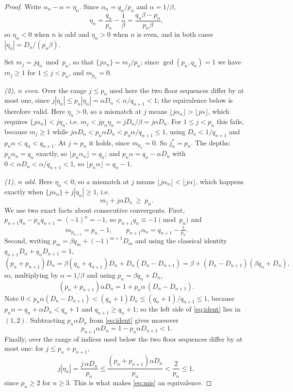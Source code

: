 \documentclass[11pt,reqno]{amsart}
\theoremstyle{plain}
\theoremstyle{definition}
\begin{document}
\begin{proof}
Write $\alpha_n-\alpha=\eta_n$. Since $\alpha_n=q_n/p_n$ and $\alpha=1/\beta$,
\[
\eta_n=\frac{q_n}{p_n}-\frac1\beta=\frac{q_n\beta-p_n}{p_n\beta},
\]
so $\eta_n<0$ when $n$ is odd and $\eta_n>0$ when $n$ is even, and in both cases
$|\eta_n|=D_n/(p_n\beta)$.

Set $m_j=jq_n \bmod p_n$, so that $\{j\alpha_n\}=m_j/p_n$; since
$\gcd(p_n,q_n)=1$ we have $m_j\ge1$ for $1\le j<p_n$, and $m_{p_n}=0$.

\emph{(2), $n$ even.} Over the range $j\le p_n$ used here the two floor
sequences differ by at most one, since
$j|\eta_n|\le p_n|\eta_n|=\alpha D_n<\alpha/q_{n+1}<1$; the equivalence below is
therefore valid. Here $\eta_n>0$, so a mismatch at $j$ means
$\lfloor j\alpha_n\rfloor>\lfloor j\alpha\rfloor$, which requires
$\{j\alpha_n\}<j\eta_n$, i.e. $m_j<jp_n\eta_n=jD_n/\beta=j\alpha D_n$. For
$1\le j<p_n$ this fails, because $m_j\ge1$ while
$j\alpha D_n<p_n\alpha D_n<p_n\alpha/q_{n+1}\le 1$, using $D_n<1/q_{n+1}$ and
$p_n\alpha<q_n<q_{n+1}$. At $j=p_n$ it holds, since $m_{p_n}=0$. So
$j^{*}_n=p_n$. The depths: $p_n\alpha_n=q_n$ exactly, so
$\lfloor p_n\alpha_n\rfloor=q_n$; and $p_n\alpha=q_n-\alpha D_n$ with
$0<\alpha D_n<\alpha/q_{n+1}<1$, so $\lfloor p_n\alpha\rfloor=q_n-1$.

\emph{(1), $n$ odd.} Here $\eta_n<0$, so a mismatch at $j$ means
$\lfloor j\alpha_n\rfloor<\lfloor j\alpha\rfloor$, which happens exactly when
$\{j\alpha_n\}+j|\eta_n|\ge1$, i.e.
\begin{equation}\label{eq:mis}
m_j+j\alpha D_n\ \ge\ p_n .
\end{equation}
We use two exact facts about consecutive convergents. First,
$p_{n+1}q_n-p_nq_{n+1}=(-1)^{n}=-1$, so $p_{n+1}q_n\equiv-1\pmod{p_n}$ and
\begin{equation}\label{eq:mstar}
m_{p_{n+1}}=p_n-1,\qquad p_{n+1}\alpha_n=q_{n+1}-\tfrac1{p_n}.
\end{equation}
Second, writing $p_m=\beta q_m+(-1)^{m+1}D_m$ and using the classical identity
$q_{n+1}D_n+q_nD_{n+1}=1$,
\[
(p_n+p_{n+1})D_n=\beta(q_n+q_{n+1})D_n+D_n(D_n-D_{n+1})
=\beta+(D_n-D_{n+1})(\beta q_n+D_n),
\]
so, multiplying by $\alpha=1/\beta$ and using $p_n=\beta q_n+D_n$,
\begin{equation}\label{eq:ident}
(p_n+p_{n+1})\alpha D_n=1+p_n\alpha\,(D_n-D_{n+1}).
\end{equation}
Note $0<p_n\alpha(D_n-D_{n+1})<(q_n+1)D_n\le (q_n+1)/q_{n+1}\le1$, because
$p_n\alpha=q_n+\alpha D_n<q_n+1$ and $q_{n+1}\ge q_n+1$; so the left side of
\eqref{eq:ident} lies in $(1,2)$. Subtracting $p_n\alpha D_n$ from
\eqref{eq:ident} gives moreover
\begin{equation}\label{eq:pn1}
p_{n+1}\alpha D_n=1-p_n\alpha D_{n+1}<1 .
\end{equation}
Finally, over the range of indices used below the two floor sequences differ by
at most one: for $j\le p_n+p_{n+1}$,
\[
j|\eta_n|=\frac{j\,\alpha D_n}{p_n}\le\frac{(p_n+p_{n+1})\alpha D_n}{p_n}<\frac{2}{p_n}\le 1,
\]
since $p_n\ge2$ for $n\ge3$. This is what makes \eqref{eq:mis} an equivalence.


\end{proof}
\end{document}
